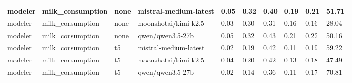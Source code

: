 \begin{tabular}{|l|l|l|l|l|l|l|l|l|l|}
 \hline
 modeler & milk\_consumption & none & mistral-medium-latest & 0.05 & 0.32 & 0.40 & 0.19 & 0.21 & 51.71 \\
 \hline
 modeler & milk\_consumption & none & moonshotai/kimi-k2.5 & 0.03 & 0.30 & 0.31 & 0.16 & 0.16 & 28.04 \\
 \hline
 modeler & milk\_consumption & none & qwen/qwen3.5-27b & 0.05 & 0.32 & 0.43 & 0.21 & 0.22 & 50.16 \\
 \hline
 modeler & milk\_consumption & t5 & mistral-medium-latest & 0.02 & 0.19 & 0.42 & 0.11 & 0.19 & 59.22 \\
 \hline
 modeler & milk\_consumption & t5 & moonshotai/kimi-k2.5 & 0.04 & 0.20 & 0.42 & 0.13 & 0.18 & 47.49 \\
 \hline
 modeler & milk\_consumption & t5 & qwen/qwen3.5-27b & 0.02 & 0.14 & 0.36 & 0.11 & 0.17 & 70.81 \\
\hline
\end{tabular}
